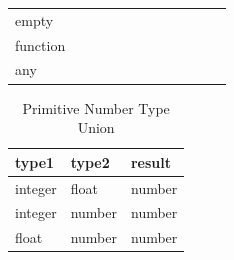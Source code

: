 \begin{table}[!h]
\begin{tabular}{ m{1.1cm} m{0.95cm} m{0.95cm} m{0.95cm} m{0.95cm} m{0.95cm} m{0.95cm} m{0.95cm} m{0.95cm} m{0.95cm} m{0.95cm} m{0.95cm}}
\multicolumn{1}{l|}{empty}    & \multicolumn{1}{l|}{\cellcolor[HTML]{036400}} & \multicolumn{1}{l|}{}                                                & \multicolumn{1}{l|}{}                         & \multicolumn{1}{l|}{}                         & \multicolumn{1}{l|}{}                         & \multicolumn{1}{l|}{}                         & \multicolumn{1}{l|}{}                         & \multicolumn{1}{l|}{}                         & \multicolumn{1}{l|}{\cellcolor[HTML]{036400}} & \multicolumn{1}{l|}{}                         & \multicolumn{1}{l|}{} \\ \cline{2-12} 
\multicolumn{1}{l|}{function} & \multicolumn{1}{l|}{\cellcolor[HTML]{FFFFFF}} & \multicolumn{1}{l|}{}                                                & \multicolumn{1}{l|}{}                         & \multicolumn{1}{l|}{}                         & \multicolumn{1}{l|}{}                         & \multicolumn{1}{l|}{}                         & \multicolumn{1}{l|}{}                         & \multicolumn{1}{l|}{}                         & \multicolumn{1}{l|}{}                         & \multicolumn{1}{l|}{\cellcolor[HTML]{036400}} & \multicolumn{1}{l|}{} \\ \cline{2-12} 
\multicolumn{1}{l|}{any}      & \multicolumn{1}{l|}{}                         & \multicolumn{1}{l|}{}                                                & \multicolumn{1}{l|}{}                         & \multicolumn{1}{l|}{}                         & \multicolumn{1}{l|}{}                         & \multicolumn{1}{l|}{}                         & \multicolumn{1}{l|}{}                         & \multicolumn{1}{l|}{}                         & \multicolumn{1}{l|}{}                         & \multicolumn{1}{l|}{}                         & \multicolumn{1}{l|}{} \\ \cline{2-12} 
\end{tabular}
     \label{tab:comp}
    \end{table}
\clearpage
\begin{table}[!h]
\caption{Primitive Number Type Union}
\begin{center}
    \begin{tabular}{lll}
        type1                        & type2  & result                      \\ \hline
        \multicolumn{1}{|l}{integer} & float  & \multicolumn{1}{l|}{number} \\ \hline
        \multicolumn{1}{|l}{integer} & number & \multicolumn{1}{l|}{number} \\ \hline
        \multicolumn{1}{|l}{float}   & number & \multicolumn{1}{l|}{number} \\ \hline
        \end{tabular}
\end{center}
 \label{tab:res}
\end{table}
